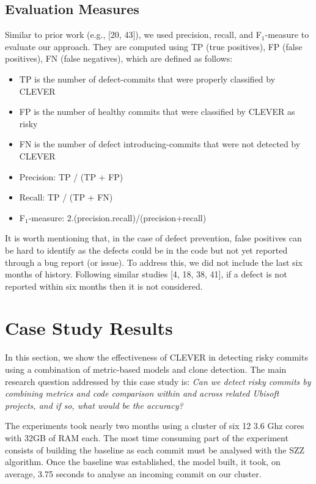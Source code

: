 \documentclass[sigconf]{acmart}
\providecommand{\tightlist}{%
  \setlength{\itemsep}{0pt}\setlength{\parskip}{0pt}}
\begin{document}
\subsection{Evaluation Measures}\label{evaluation-measures}

Similar to prior work (e.g., [20, 43]), we used precision, recall,
and F\(_1\)-measure to evaluate our approach. They are computed using TP
(true positives), FP (false positives), FN (false negatives), which are
defined as follows:

\begin{itemize}
\tightlist
\item
  TP is the number of defect-commits that were properly classified by
  CLEVER
\item
  FP is the number of healthy commits that were classified by CLEVER as
  risky
\item
  FN is the number of defect introducing-commits that were not detected
  by CLEVER
\item
  Precision: TP / (TP + FP)
\item
  Recall: TP / (TP + FN)
\item
  F\(_1\)-measure: 2.(precision.recall)/(precision+recall)
\end{itemize}

It is worth mentioning that, in the case of defect prevention, false
positives can be hard to identify as the defects could be in the code
but not yet reported through a bug report (or issue). To address this,
we did not include the last six months of history. Following similar
studies [4, 18, 38, 41], if a defect is not reported within six
months then it is not considered.

\section{Case Study Results}\label{sec:result}

In this section, we show the effectiveness of CLEVER in detecting risky
commits using a combination of metric-based models and clone detection.
The main research question addressed by this case study is: \emph{Can we
detect risky commits by combining metrics and code comparison within and
across related Ubisoft projects, and if so, what would be the accuracy?}

The experiments took nearly two months using a cluster of six 12 3.6 Ghz
cores with 32GB of RAM each. The most time consuming part of the
experiment consists of building the baseline as each commit must be
analysed with the SZZ algorithm. Once the baseline was established, the
model built, it took, on average, 3.75 seconds to analyse an incoming
commit on our cluster.
\end{document}
